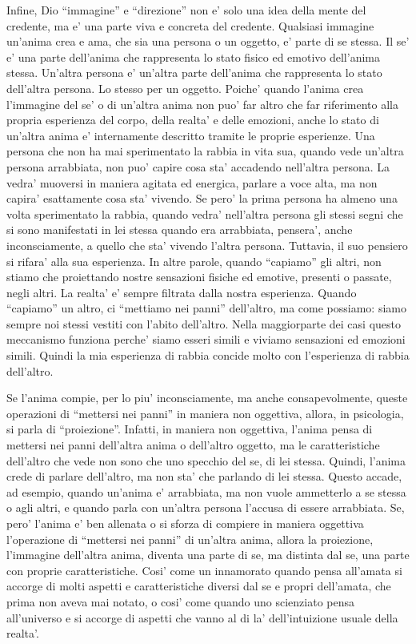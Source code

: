 Infine, Dio ``immagine'' e ``direzione'' non e' solo una idea della mente del credente, ma e' una parte viva e concreta del credente. Qualsiasi immagine un'anima crea e ama, che sia una persona o un oggetto, e' parte di se stessa. Il se' e' una parte dell'anima che rappresenta lo stato fisico ed emotivo dell'anima stessa. Un'altra persona e' un'altra parte dell'anima che rappresenta lo stato dell'altra persona. Lo stesso per un oggetto. Poiche' quando l'anima crea l'immagine del se' o di un'altra anima non puo' far altro che far riferimento alla propria esperienza del corpo, della realta' e delle emozioni, anche lo stato di un'altra anima e' internamente descritto tramite le proprie esperienze. Una persona che non ha mai sperimentato la rabbia in vita sua, quando vede un'altra persona arrabbiata, non puo' capire cosa sta' accadendo nell'altra persona. La vedra' muoversi in maniera agitata ed energica, parlare a voce alta, ma non capira' esattamente cosa sta' vivendo. Se pero' la prima persona ha almeno una volta sperimentato la rabbia, quando vedra' nell'altra persona gli stessi segni che si sono manifestati in lei stessa quando era arrabbiata, pensera', anche inconsciamente, a quello che sta' vivendo l'altra persona. Tuttavia, il suo pensiero si rifara' alla sua esperienza. In altre parole, quando ``capiamo'' gli altri, non stiamo che proiettando nostre sensazioni fisiche ed emotive, presenti o passate, negli altri. La realta' e' sempre filtrata dalla nostra esperienza. Quando ``capiamo'' un altro, ci ``mettiamo nei panni'' dell'altro, ma come possiamo: siamo sempre noi stessi vestiti con l'abito dell'altro. Nella maggiorparte dei casi questo meccanismo funziona perche' siamo esseri simili e viviamo sensazioni ed emozioni simili. Quindi la mia esperienza di rabbia concide molto con l'esperienza di rabbia dell'altro.

Se l'anima compie, per lo piu' inconsciamente, ma anche consapevolmente, queste operazioni di ``mettersi nei panni'' in maniera non oggettiva, allora, in psicologia, si parla di ``proiezione''. Infatti, in maniera non oggettiva, l'anima pensa di mettersi nei panni dell'altra anima o dell'altro oggetto, ma le caratteristiche dell'altro che vede non sono che uno specchio del se, di lei stessa. Quindi, l'anima crede di parlare dell'altro, ma non sta' che parlando di lei stessa. Questo accade, ad esempio, quando un'anima e' arrabbiata, ma non vuole ammetterlo a se stessa o agli altri, e quando parla con un'altra persona l'accusa di essere arrabbiata.
Se, pero' l'anima e' ben allenata o si sforza di compiere in maniera oggettiva l'operazione di ``mettersi nei panni'' di un'altra anima, allora la proiezione, l'immagine dell'altra anima, diventa una parte di se, ma distinta dal se, una parte con proprie caratteristiche. Cosi' come un innamorato quando pensa all'amata si accorge di molti aspetti e caratteristiche diversi dal se e propri dell'amata, che prima non aveva mai notato, o cosi' come quando uno scienziato pensa all'universo e si accorge di aspetti che vanno al di la' dell'intuizione usuale della realta'.

